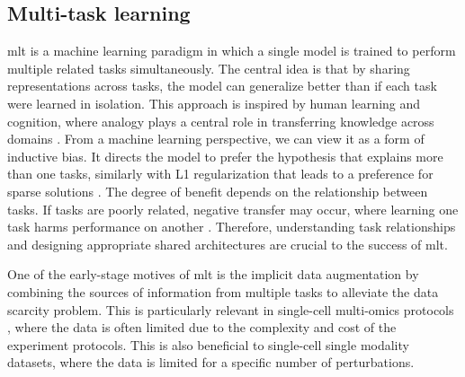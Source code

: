 \documentclass[12pt, a4paper]{article}
\begin{document}


\subsection{Multi-task learning}
\label{sec:mlt}

\gls{mlt} is a machine learning paradigm in which a single model is trained to perform multiple related tasks simultaneously. The central idea is that by sharing representations across tasks, the model can generalize better than if each task were learned in isolation. This approach is inspired by human learning and cognition, where analogy plays a central role in transferring knowledge across domains \cite{hofstadter2001analogy, zhangSurveyMultiTaskLearning2021}. From a machine learning perspective, we can view it as a form of inductive bias. It directs the model to prefer the hypothesis that explains more than one tasks, similarly with L1 regularization that leads to a preference for sparse solutions \cite{ruderOverviewMultiTaskLearning2017}. The degree of benefit depends on the relationship between tasks. If tasks are poorly related, negative transfer may occur, where learning one task harms performance on another \cite{standleyWhichTasksShould2020}. Therefore, understanding task relationships and designing appropriate shared architectures are crucial to the success of \gls{mlt}.


One of the early-stage motives of \gls{mlt} is the implicit data augmentation by combining the sources of information from multiple tasks to alleviate the data scarcity problem. This is particularly relevant in single-cell multi-omics protocols \cite{caoScButterflyVersatileSinglecell2024}, where the data is often limited due to the complexity and cost of the experiment protocols. This is also beneficial to single-cell single modality datasets, where the data is limited for a specific number of perturbations.
\end{document}
